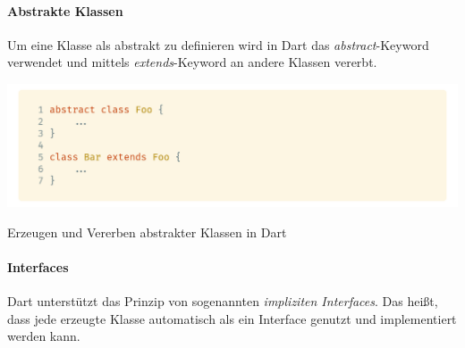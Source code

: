 \paragraph{Abstrakte Klassen}


Um eine Klasse als abstrakt zu definieren wird in Dart das \textit{abstract}-Keyword verwendet und mittels
\textit{extends}-Keyword an andere Klassen vererbt.

\begin{code}[h]
    \centering
    \includegraphics[width=1\textwidth]{images/Dart/theory/dartAbstractClass.png}
    \caption{Erzeugen und Vererben abstrakter Klassen in Dart}
\end{code}

\paragraph{Interfaces}
 

Dart unterstützt das Prinzip von sogenannten \textit{impliziten Interfaces}. Das heißt, dass jede erzeugte Klasse automatisch als ein Interface genutzt und implementiert werden kann.
